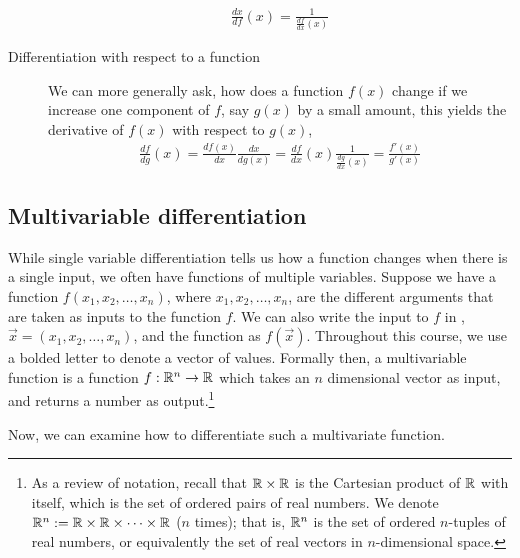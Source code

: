 \begin{description}
    \begin{align*}
        \frac{dx}{df}(x) = \frac{1}{\frac{df}{dx}(x)}
    \end{align*}  
    \item[Differentiation with respect to a function] We can more generally ask, how does a function $f(x)$ change if we increase one component of $f$, say $g(x)$ by a small amount, this yields the derivative of $f(x)$ with respect to $g(x)$,
    \begin{align*}
        \frac{df}{dg}(x) = \frac{df(x)}{dx} \frac{dx}{dg(x)} = \frac{df}{dx}(x) \frac{1}{\frac{dg}{dx}(x)} = \frac{f'(x)}{g'(x)}
    \end{align*}
\end{description}

\subsection*{Multivariable differentiation}
While single variable differentiation tells us how a function changes when there is a single input, we often have functions of multiple variables. Suppose we have a function $f(x_1, x_2, \dots, x_n)$, where $x_1, x_2, \dots, x_n$, are the different arguments that are taken as inputs to the function $f$. We can also write the input to $f$ in , $\vec{x} = (x_1, x_2, \dots, x_n)$, and the function as $f(\vec{x})$. Throughout this course, we use a bolded letter to denote a vector of values. Formally then, a multivariable function is a function $f: \mathbb{R}^n \to \mathbb{R}$ which takes an $n$ dimensional vector as input, and returns a number as output.\footnote{As a review of notation, recall that $\mathbb{R} \times \mathbb{R}$ is the Cartesian product of $\mathbb{R}$ with itself, which is the set of ordered pairs of real numbers. We denote $\mathbb{R}^n := \mathbb{R} \times \mathbb{R} \times \cdots \times \mathbb{R}$ ($n$ times); that is, $\mathbb{R}^n$ is the set of ordered $n$-tuples of real numbers, or equivalently the set of real vectors in $n$-dimensional space.}

Now, we can examine how to differentiate such a multivariate function. 

